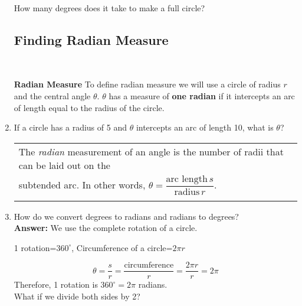\begin{enumerate}
How many degrees does it take to make a full circle?



\subsection{Finding Radian Measure} ~

\textbf{Radian Measure} To define radian measure we will use a circle
of radius $r$ and the central angle $\theta$.  $\theta$ has a measure
of \textbf{one radian} if it intercepts an arc of length equal to the
radius of the circle.



\item If a circle has a radius of 5 and  $\theta$ intercepts an arc of length 10, what is $\theta$?\vfill

\hspace{-.35in}\begin{tabular}{ | l | }
\hline The \emph{radian} measurement of an angle is the number of radii that can be laid out on the \\ subtended arc. In other words, $\theta = \dfrac{\text{arc length}\, s}{\text{radius}\, r}$. \\ \\ \hline
\end{tabular}
\newpage

\item How do we convert degrees to radians and radians to degrees?\\
\textbf{Answer:}  We use the complete rotation of a circle.
\begin{center}
1 rotation=$360^\circ$, Circumference of a circle=$2\pi r$
\end{center}
$$\theta=\frac{s}{r}=\frac{\text{circumference}}{r}=\frac{2\pi r}{r}=2\pi$$
Therefore, 1 rotation is $360^\circ=2\pi$ radians.\\
What if we divide both sides by 2?\\[.2in]


\end{enumerate}
